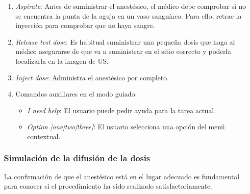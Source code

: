 \begin{enumerate}
    \item \emph{Aspirate}: Antes de suministrar el anestésico, el médico debe comprobar si no se encuentra la punta de la aguja en un vaso sanguíneo. Para ello, retrae la inyección para comprobar que no haya sangre.
\item \emph{Release test dose}: Es habitual suministrar una pequeña dosis que haga al médico asegurarse de que va a suministrar en el sitio correcto y poderla localizarla en la imagen de \ac{US}.
\item \emph{Inject dose}: Administra el anestésico por completo.

\item Comandos auxiliares en el modo guiado:
\begin{itemize}
    \item \emph{I need help}: El usuario puede pedir ayuda para la tarea actual.
\item \emph{Option [one|two|three]}: El usuario selecciona una opción del menú contextual.

\end{itemize}

\end{enumerate}

\subsubsection{Simulación de la difusión de la dosis}
\label{course:dosis}
La confirmación de que el anestésico está en el lugar adecuado es fundamental para conocer si el procedimiento ha sido realizado satisfactoriamente. %



